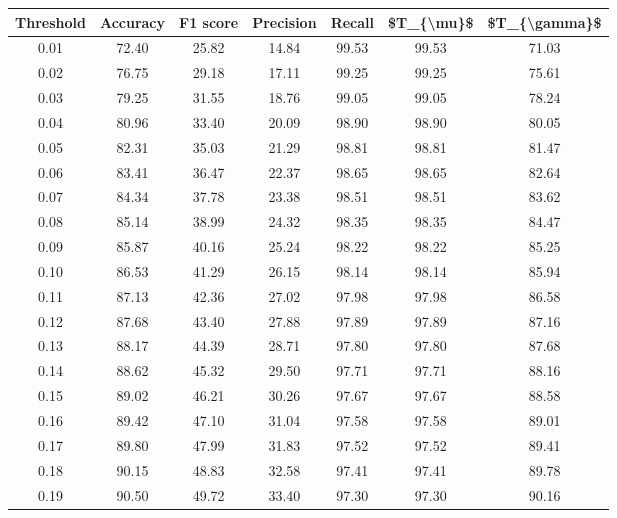 \begin{tabular}{|c|c|c|c|c|c|c|}
\toprule
 Threshold &  Accuracy &  F1 score &  Precision &  Recall &  \$T\_\{\textbackslash mu\}\$ &  \$T\_\{\textbackslash gamma\}\$ \\
\hline
      0.01 &     72.40 &     25.82 &      14.84 &   99.53 &      99.53 &         71.03 \\
      0.02 &     76.75 &     29.18 &      17.11 &   99.25 &      99.25 &         75.61 \\
      0.03 &     79.25 &     31.55 &      18.76 &   99.05 &      99.05 &         78.24 \\
      0.04 &     80.96 &     33.40 &      20.09 &   98.90 &      98.90 &         80.05 \\
      0.05 &     82.31 &     35.03 &      21.29 &   98.81 &      98.81 &         81.47 \\
      0.06 &     83.41 &     36.47 &      22.37 &   98.65 &      98.65 &         82.64 \\
      0.07 &     84.34 &     37.78 &      23.38 &   98.51 &      98.51 &         83.62 \\
      0.08 &     85.14 &     38.99 &      24.32 &   98.35 &      98.35 &         84.47 \\
      0.09 &     85.87 &     40.16 &      25.24 &   98.22 &      98.22 &         85.25 \\
      0.10 &     86.53 &     41.29 &      26.15 &   98.14 &      98.14 &         85.94 \\
      0.11 &     87.13 &     42.36 &      27.02 &   97.98 &      97.98 &         86.58 \\
      0.12 &     87.68 &     43.40 &      27.88 &   97.89 &      97.89 &         87.16 \\
      0.13 &     88.17 &     44.39 &      28.71 &   97.80 &      97.80 &         87.68 \\
      0.14 &     88.62 &     45.32 &      29.50 &   97.71 &      97.71 &         88.16 \\
      0.15 &     89.02 &     46.21 &      30.26 &   97.67 &      97.67 &         88.58 \\
      0.16 &     89.42 &     47.10 &      31.04 &   97.58 &      97.58 &         89.01 \\
      0.17 &     89.80 &     47.99 &      31.83 &   97.52 &      97.52 &         89.41 \\
      0.18 &     90.15 &     48.83 &      32.58 &   97.41 &      97.41 &         89.78 \\
      0.19 &     90.50 &     49.72 &      33.40 &   97.30 &      97.30 &         90.16 \\

\end{tabular}
